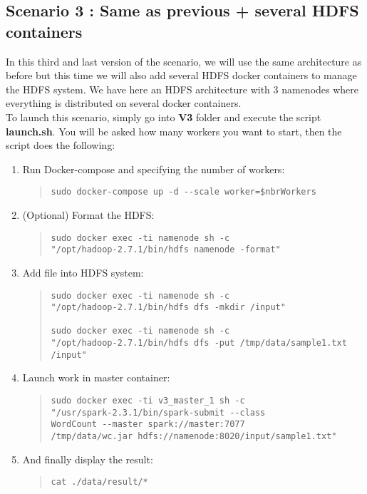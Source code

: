\documentclass{article}
\begin{document}
\subsection{Scenario 3 : Same as previous + several HDFS containers}

In this third and last version of the scenario, we will use the same architecture as before but this time we will also add several HDFS docker containers to manage the HDFS system. We have here an HDFS architecture with 3 namenodes where everything is distributed on several docker containers.\\

\noindent To launch this scenario, simply go into \textbf{V3} folder and execute the script \textbf{launch.sh}. You will be asked how many workers you want to start, then the script does the following:
\begin{enumerate}
    \item Run Docker-compose and specifying the number of workers:
    \begin{quote}
\begin{verbatim}
sudo docker-compose up -d --scale worker=$nbrWorkers
\end{verbatim}
    \end{quote}
    
    \item (Optional) Format the HDFS:
    \begin{quote}
\begin{verbatim}
sudo docker exec -ti namenode sh -c 
"/opt/hadoop-2.7.1/bin/hdfs namenode -format"
\end{verbatim}
    \end{quote}
    
    \item Add file into HDFS system:
    \begin{quote}
\begin{verbatim}
sudo docker exec -ti namenode sh -c 
"/opt/hadoop-2.7.1/bin/hdfs dfs -mkdir /input"

sudo docker exec -ti namenode sh -c 
"/opt/hadoop-2.7.1/bin/hdfs dfs -put /tmp/data/sample1.txt /input"
\end{verbatim}
    \end{quote}
    
    \item Launch work in master container:
    \begin{quote}
\begin{verbatim}
sudo docker exec -ti v3_master_1 sh -c 
"/usr/spark-2.3.1/bin/spark-submit --class 
WordCount --master spark://master:7077 
/tmp/data/wc.jar hdfs://namenode:8020/input/sample1.txt"
\end{verbatim}
    \end{quote}
    
    \item And finally display the result:
    \begin{quote}
\begin{verbatim}
cat ./data/result/*
\end{verbatim}
    \end{quote}
\end{enumerate}
\ \
\end{document}
